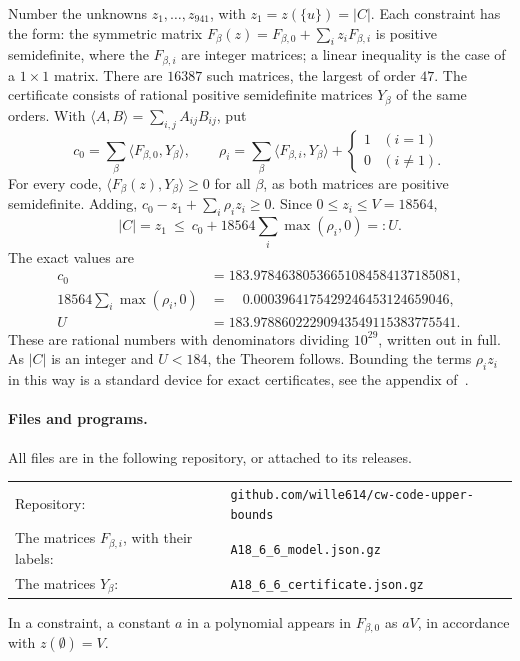 \documentclass[11pt,a4paper]{article}
\newcommand{\abs}[1]{\lvert #1\rvert}
\begin{document}
Number the unknowns $z_1,\dots,z_{941}$, with $z_1=z(\{u\})=\abs C$. Each
constraint has the form: the symmetric matrix
$F_\beta(z)=F_{\beta,0}+\sum_iz_iF_{\beta,i}$ is positive semidefinite,
where the $F_{\beta,i}$ are integer matrices; a linear inequality is the
case of a $1\times 1$ matrix. There are $16387$ such matrices, the largest
of order $47$. The certificate consists of rational positive semidefinite
matrices $Y_\beta$ of the same orders. With
$\langle A,B\rangle=\sum_{i,j}A_{ij}B_{ij}$, put
\[
c_0=\sum_\beta\langle F_{\beta,0},Y_\beta\rangle,\qquad
\rho_i=\sum_\beta\langle F_{\beta,i},Y_\beta\rangle+
\begin{cases}1&(i=1)\\0&(i\ne1).\end{cases}
\]
For every code, $\langle F_\beta(z),Y_\beta\rangle\ge 0$ for all $\beta$,
as both matrices are positive semidefinite.
Adding, $c_0-z_1+\sum_i\rho_iz_i\ge 0$. Since $0\le z_i\le V=18564$,
\[
\abs C=z_1\ \le\ c_0+18564\sum_i\max(\rho_i,0)=:U .
\]
The exact values are
\begin{align*}
c_0&=183.97846380536651084584137185081,\\
18564\textstyle\sum_i\max(\rho_i,0)&=\phantom{00}0.0003964175429246453124659046,\\
U&=183.97886022290943549115383775541 .
\end{align*}
These are rational numbers with denominators dividing $10^{29}$, written
out in full. As $\abs C$ is an integer and $U<184$, the Theorem follows.
Bounding the terms $\rho_iz_i$ in this way is a standard device for exact
certificates, see the appendix of~\cite{BP}.

\paragraph{Files and programs.}
All files are in the following repository, or attached to its releases.
\begin{center}
\begin{tabular}{ll}
Repository: & \texttt{github.com/wille614/cw-code-upper-bounds}\\
The matrices $F_{\beta,i}$, with their labels: & \texttt{A18\_6\_6\_model.json.gz}\\
The matrices $Y_\beta$: & \texttt{A18\_6\_6\_certificate.json.gz}
\end{tabular}
\end{center}
In a constraint, a constant $a$ in
a polynomial appears in $F_{\beta,0}$ as $aV$, in accordance with
$z(\emptyset)=V$.
\end{document}
